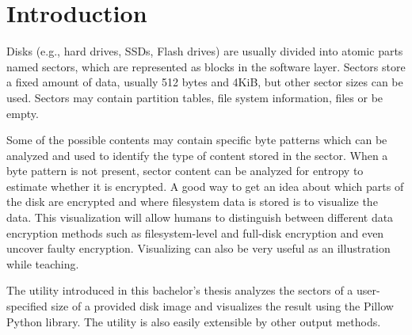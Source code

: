 \documentclass[
  digital, %
  oneside, %
  lof,     %
  lot,     %
]{fithesis4}
\begin{document}

\chapter*{Introduction}
Disks (e.g., hard drives, SSDs, Flash drives)  are usually divided into atomic parts named sectors, which are represented as blocks in the software layer.
Sectors store a fixed amount of data, usually 512 bytes and 4KiB, but other sector sizes can be used.
Sectors may contain partition tables, file system information, files or be empty.

Some of the possible contents may contain specific byte patterns which can be analyzed and used to identify the type of content stored in the sector.
When a byte pattern is not present, sector content can be analyzed for entropy to estimate whether it is encrypted.
A good way to get an idea about which parts of the disk are encrypted and where filesystem data is stored is to visualize the data.
This visualization will allow humans to distinguish between different data encryption methods such as filesystem-level and full-disk encryption and even uncover faulty encryption. %
Visualizing can also be very useful as an illustration while teaching.

The utility introduced in this bachelor's thesis analyzes the sectors of a user-specified size of a provided disk image and visualizes the result using the Pillow Python library.
The utility is also easily extensible by other output methods.
\end{document}
